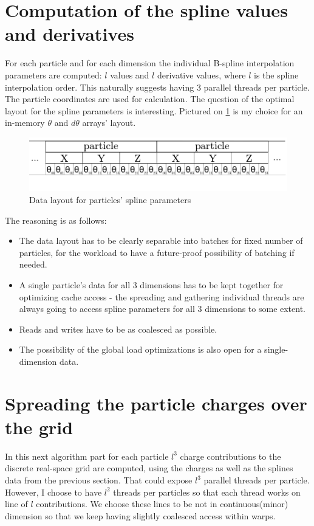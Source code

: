 \documentclass[12pt,a4paper]{report}
\newcommand{\draft}[1]{#1}
\begin{document}
\section{Computation of the spline values and derivatives}
For each particle and for each dimension the individual B-spline interpolation parameters are computed: $l$ values and $l$ derivative values, where $l$ is the spline interpolation order. This naturally suggests having 3 parallel threads per particle. The particle coordinates are used for calculation.
The question of the optimal layout for the spline parameters is interesting. Pictured on \ref{fig:spline} is my choice for an in-memory $\theta$ and $d\theta$ arrays' layout. 
\FloatBarrier
\begin{figure}[h!]
    \centering
    \includegraphics[width=1\textwidth]{pics/theta.png}
    \caption{Data layout for particles' spline parameters}
    \label{fig:spline}
\end{figure}
\FloatBarrier
The reasoning is as follows:
\begin{itemize}
\item The data layout has to be clearly separable into batches for fixed number of particles, for the workload to have a future-proof possibility of batching if needed.
\item A single particle's data for all 3 dimensions has to be kept together for optimizing cache access - the spreading and gathering individual threads are always going to access spline parameters for all 3 dimensions to some extent. 
\item Reads and writes have to be as coalesced as possible.
\item The possibility of the \draft{global load optimizations} is also open for a single-dimension data.
\end{itemize}

\section{Spreading the particle charges over the grid}
In this next algorithm part for each particle $l^3$ charge contributions to the discrete real-space grid are computed, using the charges as well as the splines data from the previous section.
That could expose $l^3$ parallel threads per particle. However, I choose to have $l^2$ threads per particles so that each thread works on line of $l$ contributions. We choose these lines to be not in continuous(minor) dimension so that we keep having slightly coalesced access within warps. 
\end{document}
